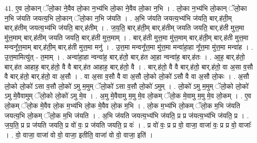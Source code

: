 \documentclass[17pt]{extarticle}
\begin{document}
41. ए॒व लो॒कान् ॅलो॒का ने॒वैव लो॒का न॒भ्य॑भि लो॒का ने॒वैव लो॒का न॒भि । . लो॒का न॒भ्य॑भि लो॒कान् ॅलो॒का न॒भि ज॑यति जयत्य॒भि लो॒कान् ॅलो॒का न॒भि ज॑यति । . अ॒भि ज॑यति जयत्य॒भ्य॑भि ज॑यति॒ बार्.ह॑ती॒म् बार्.ह॑तीम् जयत्य॒भ्य॑भि ज॑यति॒ बार्.ह॑तीम् । . ज॒य॒ति॒ बार्.ह॑ती॒म् बार्.ह॑तीम् जयति जयति॒ बार्.ह॑ती मुत्त॒मा मु॑त्त॒माम् बार्.ह॑तीम् जयति जयति॒ बार्.ह॑ती मुत्त॒माम् । . बार्.ह॑ती मुत्त॒मा मु॑त्त॒माम् बार्.ह॑ती॒म् बार्.ह॑ती मुत्त॒मा मन्वनू᳚त्त॒माम् बार्.ह॑ती॒म् बार्.ह॑ती मुत्त॒मा मनु॑ । . उ॒त्त॒मा मन्वनू᳚त्त॒मा मु॑त्त॒मा मन्वा॑हा॒हा नू᳚त्त॒मा मु॑त्त॒मा मन्वा॑ह । . उ॒त्त॒मामित्यु॑त् - त॒माम् । . अन्वा॑हा॒हा न्वन्वा॑ह॒ बार्.ह॑तो॒ बार्.ह॑त आ॒हा न्वन्वा॑ह॒ बार्.ह॑तः । . आ॒ह॒ बार्.ह॑तो॒ बार्.ह॑त आहाह॒ बार्.ह॑तो॒ वै वै बार्.ह॑त आहाह॒ बार्.ह॑तो॒ वै । . बार्.ह॑तो॒ वै वै बार्.ह॑तो॒ बार्.ह॑तो॒ वा अ॒सा व॒सौ वै बार्.ह॑तो॒ बार्.ह॑तो॒ वा अ॒सौ । . वा अ॒सा व॒सौ वै वा अ॒सौ लो॒को लो॒को॑ ऽसौ वै वा अ॒सौ लो॒कः । . अ॒सौ लो॒को लो॒को॑ ऽसा व॒सौ लो॒को॑ ऽमु म॒मुम् ॅलो॒को॑ ऽसा व॒सौ लो॒को॑ ऽमुम् । . लो॒को॑ ऽमु म॒मुम् ॅलो॒को लो॒को॑ ऽमु मे॒वैवामुम् ॅलो॒को लो॒को॑ ऽमु मे॒व । . अ॒मु मे॒वैवामु म॒मु मे॒व लो॒कम् ॅलो॒क मे॒वामु म॒मु मे॒व लो॒कम् । . ए॒व लो॒कम् ॅलो॒क मे॒वैव लो॒क म॒भ्य॑भि लो॒क मे॒वैव लो॒क म॒भि । . लो॒क म॒भ्य॑भि लो॒कम् ॅलो॒क म॒भि ज॑यति जयत्य॒भि लो॒कम् ॅलो॒क म॒भि ज॑यति । . अ॒भि ज॑यति जयत्य॒भ्य॑भि ज॑यति॒ प्र प्र ज॑यत्य॒भ्य॑भि ज॑यति॒ प्र । . ज॒य॒ति॒ प्र प्र ज॑यति जयति॒ प्र वो॑ वः॒ प्र ज॑यति जयति॒ प्र वः॑ । . प्र वो॑ वः॒ प्र प्र वो॒ वाजा॒ वाजा॑ वः॒ प्र प्र वो॒ वाजाः᳚ । . वो॒ वाजा॒ वाजा॑ वो वो॒ वाजा॒ इतीति॒ वाजा॑ वो वो॒ वाजा॒ इति॑ । \newline
\pagebreak
{}
\end{document}
